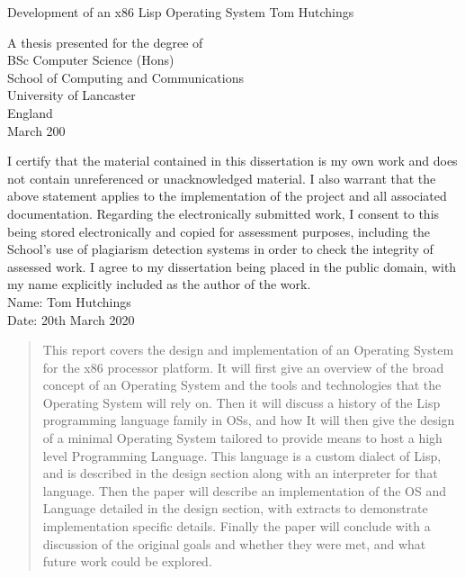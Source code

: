 \documentclass[10pt]{report}
\begin{document}
\begin{titlepage}
  \centering
  {\LARGE Development of an x86 Lisp Operating System }
  {\large Tom Hutchings}
  
\vfill            
A thesis presented for the degree of\\
BSc Computer Science (Hons)\\

\vspace{2cm}
School of Computing and Communications \\
University of Lancaster \\
England \\
March 200

\end{titlepage}

\newpage
I certify that the material contained in this dissertation is my own work and does not contain unreferenced or unacknowledged material. I also warrant that the above statement applies to the implementation of the project and all associated documentation. Regarding the electronically submitted work, I consent to this being stored electronically and copied for assessment purposes, including the School’s use of plagiarism detection systems in order to check the integrity of assessed work.
I agree to my dissertation being placed in the public domain, with my name explicitly included as the author of the work. \\
Name: Tom Hutchings \\
Date: 20th March 2020
\newpage

\begin{abstract}
  This report covers the design and implementation of an Operating System for the x86 processor platform. It will first give an overview of the broad concept of an Operating System and the tools and technologies that the Operating System will rely on. Then it will discuss a history of the Lisp programming language family in OSs, and how 
  It will then give the design of a minimal Operating System tailored to provide means to host a high level Programming Language. This language is a custom dialect of Lisp, and is described in the design section along with an interpreter for that language.
  Then the paper will describe an implementation of the OS and Language detailed in the design section, with extracts to demonstrate implementation specific details. Finally the paper will conclude with a discussion of the original goals and whether they were met, and what future work could be explored.
  
\end{abstract}
\end{document}

